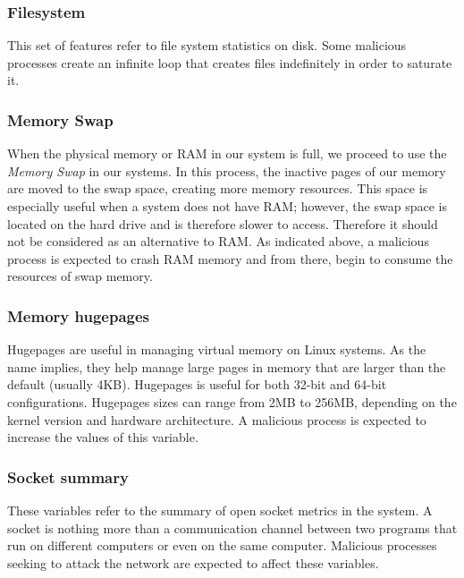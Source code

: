 \documentclass{iosart2c}
\begin{document}
\subsubsection{Filesystem}

This set of features refer to file system statistics on disk. Some malicious processes create an infinite loop that creates files indefinitely in order to saturate it. \\

\subsubsection{Memory Swap}

When the physical memory or RAM in our system is full, we proceed to use the \textit{Memory Swap} in our systems. In this process, the inactive pages of our memory are moved to the swap space, creating more memory resources. This space is especially useful when a system does not have RAM; however, the swap space is located on the hard drive and is therefore slower to access. Therefore it should not be considered as an alternative to RAM. As indicated above, a malicious process is expected to crash RAM memory and from there, begin to consume the resources of swap memory.


\subsubsection{Memory hugepages}

Hugepages are useful in managing virtual memory on Linux systems. As the name implies, they help manage large pages in memory that are larger than the default (usually 4KB). Hugepages is useful for both 32-bit and 64-bit configurations. Hugepages sizes can range from 2MB to 256MB, depending on the kernel version and hardware architecture. A malicious process is expected to increase the values of this variable. \\



\subsubsection{Socket summary}
These variables refer to the summary of open socket metrics in the system. A socket is nothing more than a communication channel between two programs that run on different computers or even on the same computer. Malicious processes seeking to attack the network are expected to affect these variables.  \\
\end{document}
